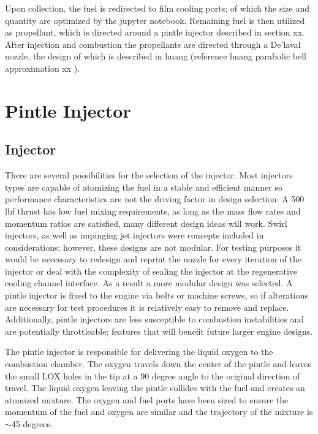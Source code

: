 \documentclass[]{aiaa-tc}%
\begin{document}
Upon collection, the fuel is redirected to film cooling ports; of which the size and quantity are optimized by the jupyter notebook. Remaining fuel is then utilized as propellant, which is directed around a pintle injector described in section xx. After injection and combustion the propellants are directed through a De’laval nozzle, the design of which is described in huang (reference huang parabolic bell approximation xx ).


\section{Pintle Injector}

\subsection{Injector} %
There are several possibilities for the selection of the injector. Most injectors types are capable of atomizing the fuel in a stable and efficient manner so performance characteristics are not the driving factor in design selection. A 500 lbf thrust has low fuel mixing requirements, as long as the mass flow rates and momentum ratios are satisfied, many different design ideas will work. Swirl injectors, as well as impinging jet injectors were concepts included in considerations; however, these designs are not modular. For testing purposes it would be necessary to redesign and reprint the nozzle for every iteration of the injector or deal with the complexity of sealing the injector at the regenerative cooling channel interface. As a result a more modular design  was selected. A pintle injector is fixed to the engine via bolts or machine screws, so if alterations are necessary for test procedures it is relatively easy to remove and replace. Additionally, pintle injectors are less susceptible to combustion instabilities and are potentially throttleable; features that will benefit future larger engine designs. 

The pintle injector is responsible for delivering the liquid oxygen to the combustion chamber. The oxygen travels down the center of the pintle and leaves the small LOX holes in the tip at a 90 degree angle to the original direction of travel. The liquid oxygen leaving the pintle collides with the fuel and creates an atomized mixture. The oxygen and fuel ports have been sized to ensure the momentum of the fuel and oxygen are similar and the trajectory of the mixture is $\sim$45 degrees.
\end{document}
